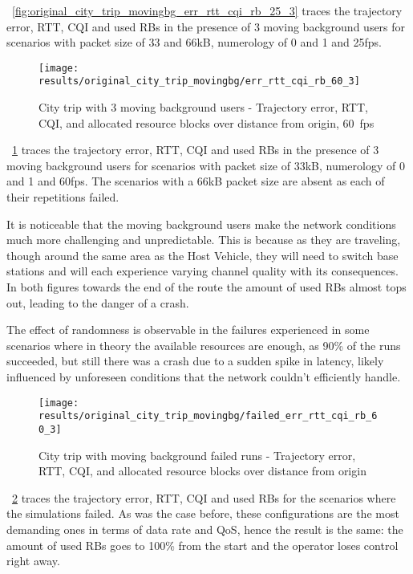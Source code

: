 \figurename~\ref{fig:original_city_trip_movingbg_err_rtt_cqi_rb_25_3} traces the trajectory error, RTT, CQI and used RBs in the presence of 3 moving background users for scenarios with packet size of 33 and 66kB, numerology of 0 and 1 and 25fps.

\begin{figure}[H]
    \centering
    \texttt{[image: results/original\_city\_trip\_movingbg/err\_rtt\_cqi\_rb\_60\_3]}
    \caption{City trip with 3 moving background users - Trajectory error, RTT, CQI, and allocated resource blocks over distance from origin, 60~fps}
    \label{fig:original_city_trip_movingbg_err_rtt_cqi_rb_60_3}
\end{figure}

\figurename~\ref{fig:original_city_trip_movingbg_err_rtt_cqi_rb_60_3} traces the trajectory error, RTT, CQI and used RBs in the presence of 3 moving background users for scenarios with packet size of 33kB, numerology of 0 and 1 and 60fps. The scenarios with a 66kB packet size are absent as each of their repetitions failed.

It is noticeable that the moving background users make the network conditions much more challenging and unpredictable. This is because as they are traveling, though around the same area as the Host Vehicle, they will need to switch base stations and will each experience varying channel quality with its consequences. In both figures towards the end of the route the amount of used RBs almost tops out, leading to the danger of a crash.

The effect of randomness is observable in the failures experienced in some scenarios where in theory the available resources are enough, as 90\% of the runs succeeded, but still there was a crash due to a sudden spike in latency, likely influenced by unforeseen conditions that the network couldn't efficiently handle.

\begin{figure}[H]
    \centering
    \texttt{[image: results/original\_city\_trip\_movingbg/failed\_err\_rtt\_cqi\_rb\_60\_3]}
    \caption{City trip with moving background failed runs - Trajectory error, RTT, CQI, and allocated resource blocks over distance from origin}
    \label{fig:original_city_trip_movingbg_failed_err_rtt_cqi_rb_60_3}
\end{figure}

\figurename~\ref{fig:original_city_trip_movingbg_failed_err_rtt_cqi_rb_60_3} traces the trajectory error, RTT, CQI and used RBs for the scenarios where the simulations failed. As was the case before, these configurations are the most demanding ones in terms of data rate and QoS, hence the result is the same: the amount of used RBs goes to 100\% from the start and the operator loses control right away.






